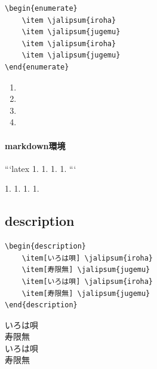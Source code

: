 \documentclass[article, head_space=25truemm, foot_space=15truemm, gutter=15truemm]{jlreq}
\begin{document}
\begin{verbatim}
\begin{enumerate}
    \item \jalipsum{iroha}
    \item \jalipsum{jugemu}
    \item \jalipsum{iroha}
    \item \jalipsum{jugemu}
\end{enumerate}
\end{verbatim}

\begin{enumerate}
    \item {}
    \item {}
    \item {}
    \item {}
\end{enumerate}

\paragraph{markdown環境}

\begin{markdown}
```latex
1. 
1. 
1. 
1. 
```
\end{markdown}

\begin{markdown}
1. 
1. 
1. 
1. 
\end{markdown}


\subsection{description}

\begin{verbatim}
\begin{description}
    \item[いろは唄] \jalipsum{iroha}
    \item[寿限無] \jalipsum{jugemu}
    \item[いろは唄] \jalipsum{iroha}
    \item[寿限無] \jalipsum{jugemu}
\end{description}
\end{verbatim}

\begin{description}
    \item[いろは唄] 
    \item[寿限無] 
    \item[いろは唄] 
    \item[寿限無] 
\end{description}
\end{document}
